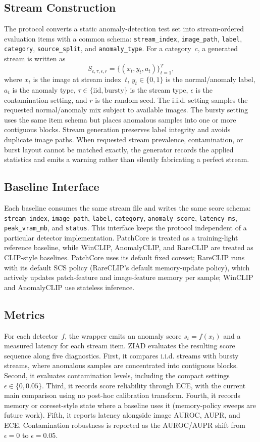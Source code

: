 \documentclass[runningheads]{llncs}
\begin{document}
\subsection{Stream Construction}
The protocol converts a static anomaly-detection test set into stream-ordered
evaluation items with a common schema:
\texttt{stream\_index}, \texttt{image\_path}, \texttt{label},
\texttt{category}, \texttt{source\_split}, and \texttt{anomaly\_type}.
For a category~\(c\), a generated stream is written as
\[
S_{c,\tau,\epsilon,r}=\{(x_t,y_t,a_t)\}_{t=1}^{T},
\]
where \(x_t\) is the image at stream index~\(t\), \(y_t\in\{0,1\}\) is the
normal/anomaly label, \(a_t\) is the anomaly type, \(\tau\in\{\mathrm{iid},
\mathrm{bursty}\}\) is the stream type, \(\epsilon\) is the contamination
setting, and \(r\) is the random seed. The i.i.d. setting samples the requested
normal/anomaly mix subject to available images. The bursty setting uses the same
item schema but places anomalous samples into one or more contiguous blocks.
Stream generation preserves label integrity and avoids duplicate image paths.
When requested stream prevalence, contamination, or burst layout cannot be
matched exactly, the generator records the applied statistics and emits a
warning rather than silently fabricating a perfect stream.

\subsection{Baseline Interface}
Each baseline consumes the same stream file and writes the same score schema:
\texttt{stream\_index}, \texttt{image\_path}, \texttt{label},
\texttt{category}, \texttt{anomaly\_score}, \texttt{latency\_ms},
\texttt{peak\_vram\_mb}, and \texttt{status}. This interface keeps the
protocol independent of a particular detector implementation. PatchCore is
treated as a training-light reference baseline, while WinCLIP, AnomalyCLIP, and
RareCLIP are treated as CLIP-style baselines. PatchCore uses its default fixed coreset; RareCLIP runs with its default SCS
policy (RareCLIP's default memory-update policy), which actively updates
patch-feature and image-feature memory per sample; WinCLIP and AnomalyCLIP use stateless inference.

\subsection{Metrics}
For each detector~\(f\), the wrapper emits an anomaly score
\(s_t=f(x_t)\) and a measured latency for each stream item. ZIAD evaluates the
resulting score sequence along five diagnostics. First, it compares i.i.d. streams with
bursty streams, where anomalous samples are concentrated into contiguous
blocks. Second, it evaluates contamination levels, including the compact
settings \(\epsilon \in \{0, 0.05\}\). Third, it records score
reliability through ECE, with the current main comparison using no post-hoc
calibration transform. Fourth, it records memory or coreset-style state where a
baseline uses it (memory-policy sweeps are future work). Fifth,
it reports latency alongside image AUROC, AUPR, and ECE. Contamination robustness
is reported as the AUROC/AUPR shift from $\epsilon{=}0$ to $\epsilon{=}0.05$.
\end{document}
